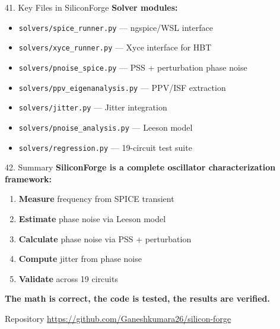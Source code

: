 \documentclass[aspectratio=169, 11pt]{beamer}
\begin{document}
\begin{frame}{41. Key Files in SiliconForge}
    \textbf{Solver modules:}

    \vspace{0.5em}
    \begin{itemize}
        \item \texttt{solvers/spice\_runner.py} — ngspice/WSL interface
        \item \texttt{solvers/xyce\_runner.py} — Xyce interface for HBT
        \item \texttt{solvers/pnoise\_spice.py} — PSS + perturbation phase noise
        \item \texttt{solvers/ppv\_eigenanalysis.py} — PPV/ISF extraction
        \item \texttt{solvers/jitter.py} — Jitter integration
        \item \texttt{solvers/pnoise\_analysis.py} — Leeson model
        \item \texttt{solvers/regression.py} — 19-circuit test suite
    \end{itemize}
\end{frame}

\begin{frame}{42. Summary}
    \textbf{SiliconForge is a complete oscillator characterization framework:}

    \vspace{0.5em}
    \begin{enumerate}
        \item \textbf{Measure} frequency from SPICE transient
        \item \textbf{Estimate} phase noise via Leeson model
        \item \textbf{Calculate} phase noise via PSS + perturbation
        \item \textbf{Compute} jitter from phase noise
        \item \textbf{Validate} across 19 circuits
    \end{enumerate}

    \vspace{0.5em}
    \textbf{The math is correct, the code is tested, the results are verified.}

    \vspace{0.5em}
    \begin{block}{Repository}
        \url{https://github.com/Ganeshkumara26/silicon-forge}
    \end{block}
\end{frame}
\end{document}
